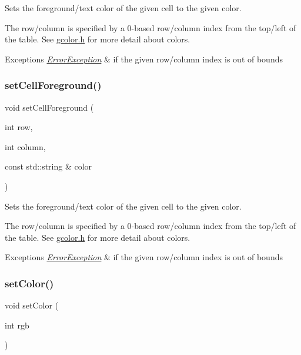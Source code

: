 Sets the foreground/text color of the given cell to the given color. 

The row/column is specified by a 0-\/based row/column index from the top/left of the table. See \mbox{\hyperlink{gcolor_8h_source}{gcolor.\+h}} for more detail about colors. 
\begin{DoxyExceptions}{Exceptions}
{\em \mbox{\hyperlink{classErrorException}{Error\+Exception}}} & if the given row/column index is out of bounds \\
\hline
\end{DoxyExceptions}
\mbox{\label{classGTable_ab0bdc2afa7ef003fa5e8ab6eb25a7282}} 
\subsubsection{\texorpdfstring{set\+Cell\+Foreground()}{setCellForeground()}\hspace{0.1cm}{\footnotesize\ttfamily [2/2]}}
{\footnotesize\ttfamily void set\+Cell\+Foreground (\begin{DoxyParamCaption}\item[{int}]{row,  }\item[{int}]{column,  }\item[{const std\+::string \&}]{color }\end{DoxyParamCaption})\hspace{0.3cm}{\ttfamily [virtual]}}



Sets the foreground/text color of the given cell to the given color. 

The row/column is specified by a 0-\/based row/column index from the top/left of the table. See \mbox{\hyperlink{gcolor_8h_source}{gcolor.\+h}} for more detail about colors. 
\begin{DoxyExceptions}{Exceptions}
{\em \mbox{\hyperlink{classErrorException}{Error\+Exception}}} & if the given row/column index is out of bounds \\
\hline
\end{DoxyExceptions}
\mbox{\label{classGTable_afd1f50a2c4695c79b8633d860bce5398}} 
\subsubsection{\texorpdfstring{set\+Color()}{setColor()}\hspace{0.1cm}{\footnotesize\ttfamily [1/2]}}
{\footnotesize\ttfamily void set\+Color (\begin{DoxyParamCaption}\item[{int}]{rgb }\end{DoxyParamCaption})\hspace{0.3cm}{\ttfamily [virtual]}}



